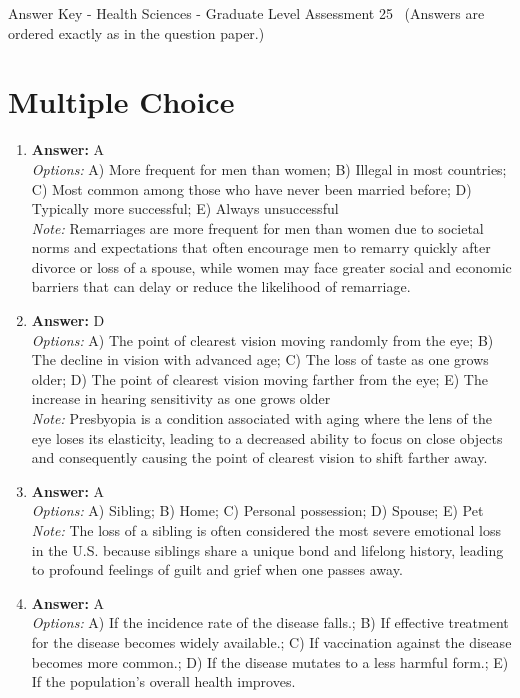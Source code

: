 \documentclass[12pt]{article}
\begin{document}
\begin{center}
Answer Key - Health Sciences - Graduate Level Assessment 25 \
\small (Answers are ordered exactly as in the question paper.)
\end{center}

\section*{Multiple Choice}
\begin{enumerate}[label=\arabic*.]
\item \textbf{Answer:} A
\\ \textit{Options:} A) More frequent for men than women; B) Illegal in most countries; C) Most common among those who have never been married before; D) Typically more successful; E) Always unsuccessful
\\ \textit{Note:} Remarriages are more frequent for men than women due to societal norms and expectations that often encourage men to remarry quickly after divorce or loss of a spouse, while women may face greater social and economic barriers that can delay or reduce the likelihood of remarriage.
\item \textbf{Answer:} D
\\ \textit{Options:} A) The point of clearest vision moving randomly from the eye; B) The decline in vision with advanced age; C) The loss of taste as one grows older; D) The point of clearest vision moving farther from the eye; E) The increase in hearing sensitivity as one grows older
\\ \textit{Note:} Presbyopia is a condition associated with aging where the lens of the eye loses its elasticity, leading to a decreased ability to focus on close objects and consequently causing the point of clearest vision to shift farther away.
\item \textbf{Answer:} A
\\ \textit{Options:} A) Sibling; B) Home; C) Personal possession; D) Spouse; E) Pet
\\ \textit{Note:} The loss of a sibling is often considered the most severe emotional loss in the U.S. because siblings share a unique bond and lifelong history, leading to profound feelings of guilt and grief when one passes away.
\item \textbf{Answer:} A
\\ \textit{Options:} A) If the incidence rate of the disease falls.; B) If effective treatment for the disease becomes widely available.; C) If vaccination against the disease becomes more common.; D) If the disease mutates to a less harmful form.; E) If the population's overall health improves.

\end{enumerate}
\end{document}
